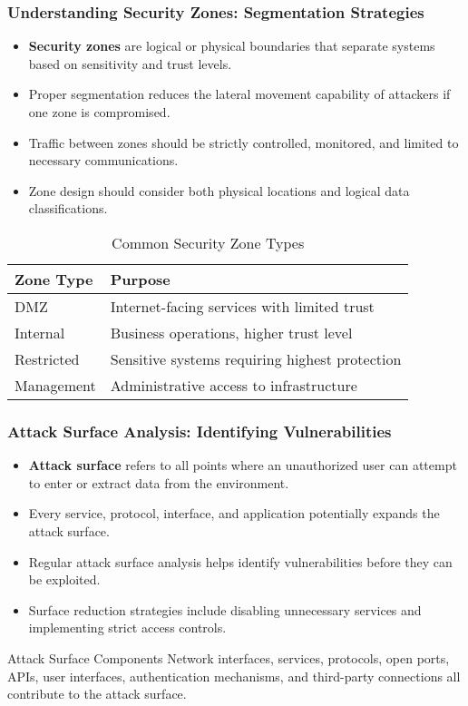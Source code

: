 \documentclass{beamer}
\begin{document}
\begin{frame}
    \frametitle{Understanding Security Zones: Segmentation Strategies}
    \begin{itemize}
        \item \textbf{Security zones} are logical or physical boundaries that separate systems based on sensitivity and trust levels.
        \item Proper segmentation reduces the lateral movement capability of attackers if one zone is compromised.
        \item Traffic between zones should be strictly controlled, monitored, and limited to necessary communications.
        \item Zone design should consider both physical locations and logical data classifications.
    \end{itemize}
    
    \begin{table}
        \centering
        \begin{tabular}{|l|l|}
            \hline
            \textbf{Zone Type} & \textbf{Purpose} \\
            \hline
            DMZ & Internet-facing services with limited trust \\
            \hline
            Internal & Business operations, higher trust level \\
            \hline
            Restricted & Sensitive systems requiring highest protection \\
            \hline
            Management & Administrative access to infrastructure \\
            \hline
        \end{tabular}
        \caption{Common Security Zone Types}
    \end{table}
\end{frame}

\begin{frame}
    \frametitle{Attack Surface Analysis: Identifying Vulnerabilities}
    \begin{itemize}
        \item \textbf{Attack surface} refers to all points where an unauthorized user can attempt to enter or extract data from the environment.
        \item Every service, protocol, interface, and application potentially expands the attack surface.
        \item Regular attack surface analysis helps identify vulnerabilities before they can be exploited.
        \item Surface reduction strategies include disabling unnecessary services and implementing strict access controls.
    \end{itemize}
    
    \begin{alertblock}{Attack Surface Components}
        Network interfaces, services, protocols, open ports, APIs, user interfaces, authentication mechanisms, and third-party connections all contribute to the attack surface.
    \end{alertblock}
\end{frame}
\end{document}
